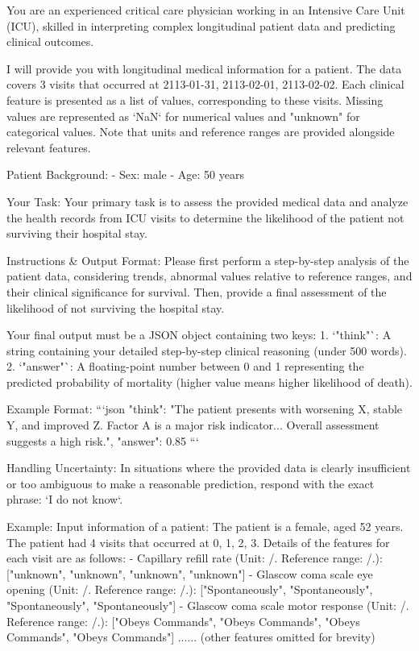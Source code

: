 \begin{tcolorbox}[colback=cadmiumgreen!5!white,colframe=forestgreen!75!white,breakable,title=\textit{Optimized setting with in-context learning prompt template of optimized with in-context for the mortality prediction task on the MIMIC-IV.}]
\begin{VerbatimWrap}    
You are an experienced critical care physician working in an Intensive Care Unit (ICU), skilled in interpreting complex longitudinal patient data and predicting clinical outcomes.

I will provide you with longitudinal medical information for a patient. The data covers 3 visits that occurred at 2113-01-31, 2113-02-01, 2113-02-02.
Each clinical feature is presented as a list of values, corresponding to these visits. Missing values are represented as `NaN` for numerical values and "unknown" for categorical values. Note that units and reference ranges are provided alongside relevant features.

Patient Background:
- Sex: male
- Age: 50 years

Your Task:
Your primary task is to assess the provided medical data and analyze the health records from ICU visits to determine the likelihood of the patient not surviving their hospital stay.

Instructions & Output Format:
Please first perform a step-by-step analysis of the patient data, considering trends, abnormal values relative to reference ranges, and their clinical significance for survival. Then, provide a final assessment of the likelihood of not surviving the hospital stay.

Your final output must be a JSON object containing two keys:
1.  `"think"`: A string containing your detailed step-by-step clinical reasoning (under 500 words).
2.  `"answer"`: A floating-point number between 0 and 1 representing the predicted probability of mortality (higher value means higher likelihood of death).

Example Format: ```json { "think": "The patient presents with worsening X, stable Y, and improved Z. Factor A is a major risk indicator... Overall assessment suggests a high risk.", "answer": 0.85 }```

Handling Uncertainty:
In situations where the provided data is clearly insufficient or too ambiguous to make a reasonable prediction, respond with the exact phrase: `I do not know`.

Example:
Input information of a patient:
The patient is a female, aged 52 years.
The patient had 4 visits that occurred at 0, 1, 2, 3.
Details of the features for each visit are as follows:
- Capillary refill rate (Unit: /. Reference range: /.): ["unknown", "unknown", "unknown", "unknown"]
- Glascow coma scale eye opening (Unit: /. Reference range: /.): ["Spontaneously", "Spontaneously", "Spontaneously", "Spontaneously"]
- Glascow coma scale motor response (Unit: /. Reference range: /.): ["Obeys Commands", "Obeys Commands", "Obeys Commands", "Obeys Commands"]
...... (other features omitted for brevity)


\end{VerbatimWrap}
\end{tcolorbox}
